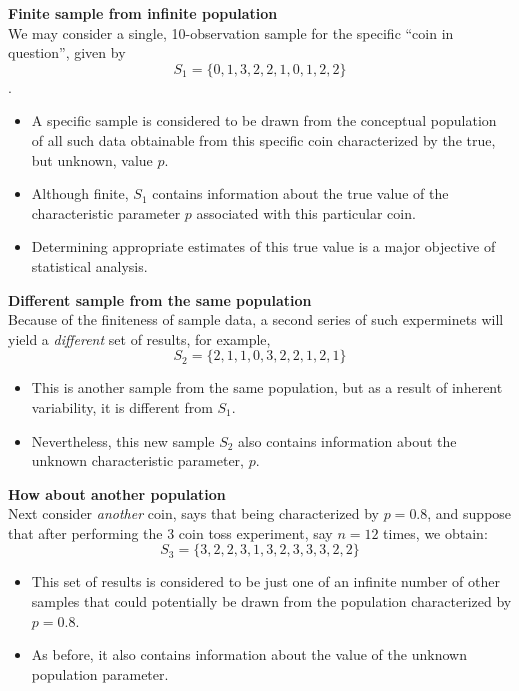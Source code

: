 \documentclass[twoside]{article}
\makeatletter
\theoremstyle{definition}
\theoremstyle{remark}
\theoremstyle{remark}
\newenvironment{example}
 {\patchcmd{\@thm}{\trivlist}{\list{}{\leftmargin=3em \rightmargin=3em}}{}{}%
  \vspace*{10\p@}
  \innerexample\pushQED{\hfill\ensuremath{\Diamond}}}
 {\popQED\endinnerexample}
\makeatother
\begin{document}
\begin{example}{3 coin tossing revisit}
  \textbf{Finite sample from infinite population}\\
  We may consider a single, 10-observation sample for the specific ``coin in
  question'', given by
  \begin{equation*}
    S_1 = \{ 0, 1, 3, 2, 2, 1, 0, 1, 2, 2 \}
  \end{equation*}.
  \begin{itemize}
    \item A specific sample is considered to be drawn from the conceptual
    population of all such data obtainable from this specific coin characterized
    by the true, but unknown, value $p$.
    \item Although finite, $S_1$ contains information about the true value of the
    characteristic parameter $p$ associated with this particular coin.
    \item Determining appropriate estimates of this true value is a major
    objective of statistical analysis.
  \end{itemize}

  \textbf{Different sample from the same population}\\
  Because of the finiteness of sample data, a second series of such experminets
  will yield a \textit{different} set of results, for example,
  \begin{equation*}
    S_2 = \{ 2, 1, 1, 0, 3, 2, 2, 1, 2, 1 \}
  \end{equation*}
  \begin{itemize}
    \item This is another sample from the same population, but as a result of
    inherent variability, it is different from $S_1$.
    \item Nevertheless, this new sample $S_2$ also contains information about
    the unknown characteristic parameter, $p$.
  \end{itemize}

  \textbf{How about another population}\\
  Next consider \textit{another} coin, says that being characterized by $p=0.8$,
  and suppose that after performing the 3 coin toss experiment, say $n=12$ times,
  we obtain:
  \begin{equation*}
    S_3 = \{ 3, 2, 2, 3, 1, 3, 2, 3, 3, 3, 2, 2 \}
  \end{equation*}
  \begin{itemize}
    \item This set of results is considered to be just one of an infinite number
    of other samples that could potentially be drawn from the population
    characterized by $p=0.8$.
    \item As before, it also contains information about the value of the unknown
    population parameter.
  \end{itemize}


\end{example}
\end{document}
